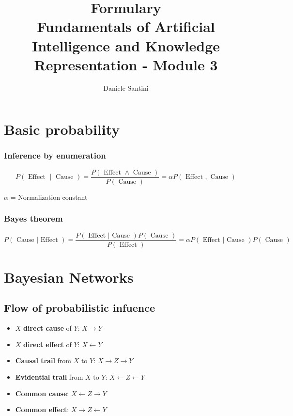 \documentclass[]{article}
\title{Formulary \\ \large Fundamentals of Artificial Intelligence and Knowledge Representation - Module 3}
\author{Daniele Santini}
\begin{document}

\section{Basic probability}

\subsubsection{Inference by enumeration}
$$
P(\text { Effect } \mid \text { Cause })=\frac{P(\text { Effect } \wedge \text { Cause })}{P(\text { Cause })}=\alpha P(\text { Effect }, \text { Cause })
$$

$\alpha$ = Normalization constant

\subsubsection{Bayes theorem}
$$
P(\text { Cause } | \text { Effect })=\frac{P(\text { Effect } | \text { Cause }) P( \text{ Cause })}{P(\text { Effect })}=\alpha P(\text { Effect } | \text { Cause }) P( \text{ Cause })
$$

\section{Bayesian Networks}

\subsection{Flow of probabilistic infuence}

\begin{itemize}
	\item $X$ \textbf{direct cause} of $Y$: $X \rightarrow Y$
	\item $X$ \textbf{direct effect} of $Y$: $X \leftarrow Y$
	\item \textbf{Causal trail} from $X$ to $Y$: $X \rightarrow Z \rightarrow Y$
	\item \textbf{Evidential trail} from $X$ to $Y$: $X \leftarrow Z \leftarrow Y$
	\item \textbf{Common cause}: $X \leftarrow Z \rightarrow Y$
	\item \textbf{Common effect}: $X \rightarrow Z \leftarrow Y$
\end{itemize}
\end{document}
